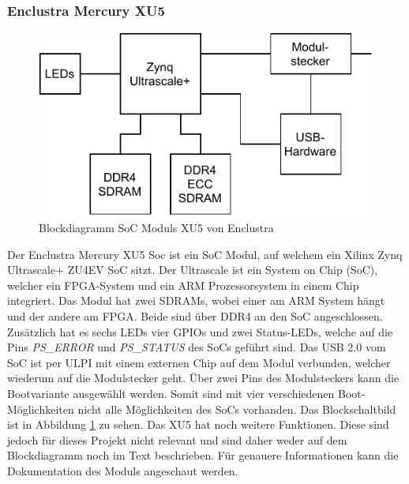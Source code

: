 \documentclass{article}
\begin{document}
\subsubsection*{Enclustra Mercury XU5}
\begin{figure}[tb]
    \includegraphics[width=\linewidth]{drawio/bd_xu5}
    \caption{Blockdiagramm SoC Moduls XU5 von Enclustra}
    \label{fig:bd_xu5}
\end{figure}
Der Enclustra Mercury XU5 Soc ist ein SoC Modul, auf welchem ein Xilinx Zynq Ultrascale+ ZU4EV SoC sitzt. 
Der Ultrascale ist ein System on Chip (SoC), welcher ein FPGA-System und ein ARM Prozessorsystem in einem Chip integriert. 
Das Modul hat zwei SDRAMs, wobei einer am ARM System hängt und der andere am FPGA. Beide sind über DDR4 an den SoC angeschlossen. 
Zusätzlich hat es sechs LEDs vier GPIOs und zwei Status-LEDs, welche auf die Pins \textit{PS\_ERROR} und \textit{PS\_STATUS} des SoCs geführt sind. 
Das USB 2.0 vom SoC ist per ULPI mit einem externen Chip auf dem Modul verbunden, welcher wiederum auf die Modulstecker geht. Über zwei Pins des Modulsteckers kann die Bootvariante ausgewählt werden. Somit sind mit vier verschiedenen Boot-Möglichkeiten nicht alle Möglichkeiten des SoCs vorhanden.
Das Blockschaltbild ist in Abbildung \ref{fig:bd_xu5} zu sehen. Das XU5 hat noch weitere Funktionen. 
Diese sind jedoch für dieses Projekt nicht relevant und sind daher weder auf dem Blockdiagramm noch im Text beschrieben. 
Für genauere Informationen kann die Dokumentation des Moduls angeschaut werden. 
\end{document}
